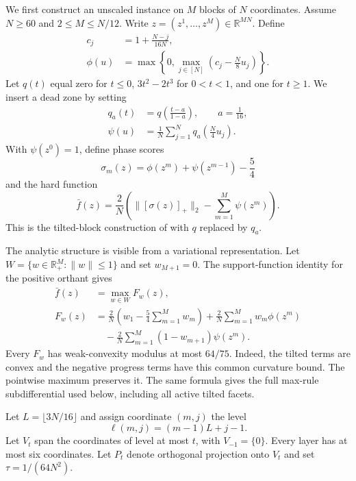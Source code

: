 \documentclass[twoside]{article}
\newcommand{\R}{\mathbb R}
\begin{document}
We first construct an unscaled instance on $M$ blocks of $N$ coordinates. Assume $N\geq60$ and $2\leq M\leq N/12$. Write $z=(z^1,\ldots,z^M)\in\R^{MN}$. Define
\begin{align*}
 c_j&=1+\frac{N-j}{16N},\\
 \phi(u)&=\max\left\{0,\max_{j\in[N]}
 \left(c_j-\frac N8u_j\right)\right\}.
\end{align*}
Let $q(t)$ equal zero for $t\leq0$, $3t^2-2t^3$ for $0<t<1$, and one for $t\geq1$. We insert a dead zone by setting
\begin{align*}
 q_a(t)&=q\left(\frac{t-a}{1-a}\right),\qquad a=\frac1{16},\\
 \psi(u)&=\frac1N\sum_{j=1}^N q_a\left(\frac N4u_j\right).
\end{align*}
With $\psi(z^0)=1$, define phase scores \[ \sigma_m(z)=\phi(z^m)+\psi(z^{m-1})-\frac54 \] and the hard function
\begin{equation}
 \bar f(z)=\frac2N\left(\|[\sigma(z)]_+\|_2
 -\sum_{m=1}^M\psi(z^m)\right).
 \label{eq:base}
\end{equation}
This is the tilted-block construction of \citet{li2026deterministic} with $q$ replaced by $q_a$.

The analytic structure is visible from a variational representation. Let $W=\{w\in\R_+^M:\|w\|\leq1\}$ and set $w_{M+1}=0$. The support-function identity for the positive orthant gives
\begin{align}
 \bar f(z)&=\max_{w\in W}F_w(z),\nonumber\\
 F_w(z)&=\frac2N\left(w_1-\frac54\sum_{m=1}^Mw_m\right)
 +\frac2N\sum_{m=1}^Mw_m\phi(z^m)\nonumber\\
 &\quad-\frac2N\sum_{m=1}^M(1-w_{m+1})\psi(z^m).
 \label{eq:variational}
\end{align}
Every $F_w$ has weak-convexity modulus at most $64/75$. Indeed, the tilted terms are convex and the negative progress terms have this common curvature bound. The pointwise maximum preserves it. The same formula gives the full max-rule subdifferential used below, including all active tilted facets.

Let $L=\lfloor3N/16\rfloor$ and assign coordinate $(m,j)$ the level \[ \ell(m,j)=(m-1)L+j-1. \] Let $V_t$ span the coordinates of level at most $t$, with $V_{-1}=\{0\}$. Every layer has at most six coordinates. Let $P_t$ denote orthogonal projection onto $V_t$ and set $\tau=1/(64N^2)$.
\end{document}
